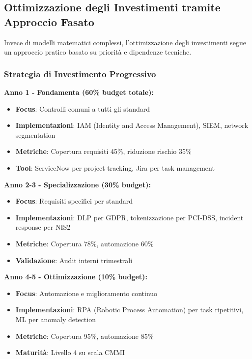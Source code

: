 \subsection{Ottimizzazione degli Investimenti tramite Approccio Fasato}

Invece di modelli matematici complessi, l'ottimizzazione degli investimenti segue un approccio pratico basato su priorità e dipendenze tecniche\autocite{Bertsekas2017}.

\subsubsection{Strategia di Investimento Progressivo}

\textbf{Anno 1 - Fondamenta (60\% budget totale):}
\begin{itemize}
    \item \textbf{Focus}: Controlli comuni a tutti gli standard
    \item \textbf{Implementazioni}: IAM (Identity and Access Management), SIEM, network segmentation
    \item \textbf{Metriche}: Copertura requisiti 45\%, riduzione rischio 35\%
    \item \textbf{Tool}: ServiceNow per project tracking, Jira per task management
\end{itemize}

\textbf{Anno 2-3 - Specializzazione (30\% budget):}
\begin{itemize}
    \item \textbf{Focus}: Requisiti specifici per standard
    \item \textbf{Implementazioni}: DLP per GDPR, tokenizzazione per PCI-DSS, incident response per NIS2
    \item \textbf{Metriche}: Copertura 78\%, automazione 60\%
    \item \textbf{Validazione}: Audit interni trimestrali
\end{itemize}

\textbf{Anno 4-5 - Ottimizzazione (10\% budget):}
\begin{itemize}
    \item \textbf{Focus}: Automazione e miglioramento continuo
    \item \textbf{Implementazioni}: RPA (Robotic Process Automation) per task ripetitivi, ML per anomaly detection
    \item \textbf{Metriche}: Copertura 95\%, automazione 85\%
    \item \textbf{Maturità}: Livello 4 su scala CMMI
\end{itemize}

